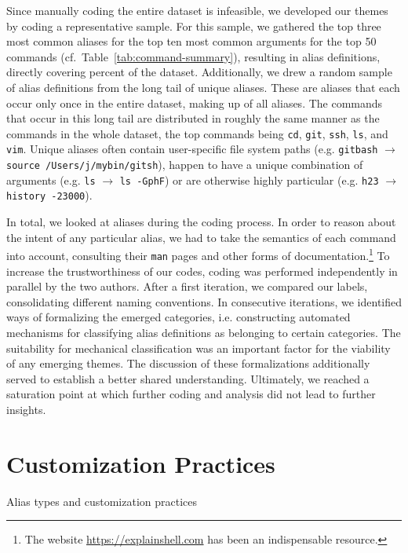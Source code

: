 \documentclass[smallextended,natbib]{svjour3}
\newcommand{\num}[1]{\numprint{#1}}
\newcommand{\per}[1]{\numprint[\%]{#1}}
\newcommand{\alias}[2]{{\texttt{#1} $\rightarrow$ \texttt{#2}}}
\newcommand{\cmd}[1]{{\texttt{#1}}}
\begin{document}
Since manually coding the entire dataset is infeasible, we developed our themes by coding a representative sample.
For this sample, we gathered the top three most common aliases for the top ten most common arguments for the top 50 commands (cf.\ Table~\ref{tab:command-summary}), resulting in \num{1381} alias definitions, directly covering \per{28.77} percent of the dataset.
Additionally, we drew a random sample of \num{200} alias definitions from the long tail of unique aliases.
These are aliases that each occur only once in the entire dataset, making up \per{27.53} of all aliases.
The commands that occur in this long tail are distributed in roughly the same manner as the commands in the whole dataset, the top commands being \cmd{cd}, \cmd{git}, \cmd{ssh}, \cmd{ls}, and \cmd{vim}.
Unique aliases often contain user-specific file system paths (e.g. \alias{gitbash}{source /Users/j/mybin/gitsh}), happen to have a unique combination of arguments (e.g. \alias{ls}{ls -GphF}) or are otherwise highly particular (e.g. \alias{h23}{history -23000}).

In total, we looked at \num{1581} aliases during the coding process.
In order to reason about the intent of any particular alias, we had to take the semantics of each command into account, consulting their \texttt{man} pages and other forms of documentation.\footnote{The website \url{https://explainshell.com} has been an indispensable resource.}
To increase the trustworthiness of our codes, coding was performed independently in parallel by the two authors.
After a first iteration, we compared our labels, consolidating different naming conventions.
In consecutive iterations, we identified ways of formalizing the emerged categories, i.e. constructing automated mechanisms for classifying alias definitions as belonging to certain categories.
The suitability for mechanical classification was an important factor for the viability of any emerging themes.
The discussion of these formalizations additionally served to establish a better shared understanding.
Ultimately, we reached a saturation point at which further coding and analysis did not lead to further insights.

\section{Customization Practices}

\begin{table}
    \centering
	\caption{Alias types and customization practices}
    \label{tab:practices}
    
\end{table}
\end{document}
